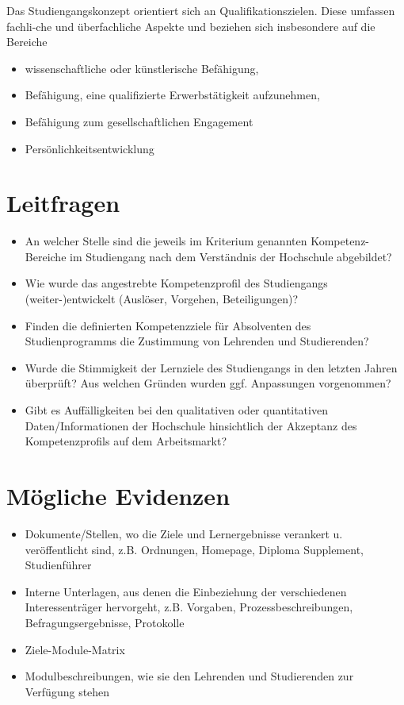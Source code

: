 Das Studiengangskonzept orientiert sich an Qualifikationszielen. Diese
umfassen fachli-che und überfachliche Aspekte und beziehen sich
insbesondere auf die Bereiche

\begin{itemize}
\item
  wissenschaftliche oder künstlerische Befähigung,
\item
  Befähigung, eine qualifizierte Erwerbstätigkeit aufzunehmen,
\item
  Befähigung zum gesellschaftlichen Engagement
\item
  Persönlichkeitsentwicklung
\end{itemize}

\section{Leitfragen}\label{leitfragen}

\begin{itemize}
\item
  An welcher Stelle sind die jeweils im Kriterium genannten
  Kompetenz-Bereiche im Studiengang nach dem Verständnis der Hochschule
  abgebildet?
\item
  Wie wurde das angestrebte Kompetenzprofil des Studiengangs
  (weiter-)entwickelt (Auslöser, Vorgehen, Beteiligungen)?
\item
  Finden die definierten Kompetenzziele für Absolventen des
  Studienprogramms die Zustimmung von Lehrenden und Studierenden?
\item
  Wurde die Stimmigkeit der Lernziele des Studiengangs in den letzten
  Jahren überprüft? Aus welchen Gründen wurden ggf. Anpassungen
  vorgenommen?
\item
  Gibt es Auffälligkeiten bei den qualitativen oder quantitativen
  Daten/Informationen der Hochschule hinsichtlich der Akzeptanz des
  Kompetenzprofils auf dem Arbeitsmarkt?
\end{itemize}

\section{Mögliche Evidenzen}\label{muxf6gliche-evidenzen}

\begin{itemize}
\item
  Dokumente/Stellen, wo die Ziele und Lernergebnisse verankert u.
  veröffentlicht sind, z.B. Ordnungen, Homepage, Diploma Supplement,
  Studienführer
\item
  Interne Unterlagen, aus denen die Einbeziehung der verschiedenen
  Interessenträger hervorgeht, z.B. Vorgaben, Prozessbeschreibungen,
  Befragungsergebnisse, Protokolle
\item
  Ziele-Module-Matrix
\item
  Modulbeschreibungen, wie sie den Lehrenden und Studierenden zur
  Verfügung stehen
\end{itemize}

